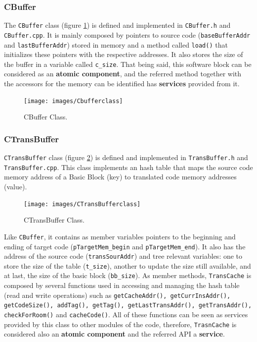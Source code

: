 \documentclass[12pt]{article}
\begin{document}
{\newpage
\subsubsection*{CBuffer}

The \texttt{CBuffer} class (figure \ref{fig:cbufferclass}) is defined and implemented in \texttt{CBuffer.h} and \texttt{CBuffer.cpp}. It is mainly composed by pointers to source code (\texttt{baseBufferAddr} and \texttt{lastBufferAddr}) stored in memory and a method called \texttt{load()} that initializes these pointers with the respective addresses. It also stores the size of the buffer in a variable called \texttt{c\_size}. That being said, this software block can be considered as an \textbf{atomic component}, and the referred method together with the accessors for the memory can be identified has \textbf{services} provided from it.

\begin{figure}[!htb]
\centerline{
\texttt{[image: images/Cbufferclass]}}
\caption{CBuffer Class.}
\label{fig:cbufferclass} 
\end{figure}

\subsubsection*{CTransBuffer}

\texttt{CTransBuffer} class (figure \ref{fig:tbufferclass}) is defined and implemented in \texttt{TransBuffer.h} and \texttt{TransBuffer.cpp}. This class implements an hash table that maps the source code memory address of a Basic Block (key) to translated code memory addresses (value). 

\begin{figure}[!htb]
\centerline{
\texttt{[image: images/CTransBufferclass]}}
\caption{CTransBuffer Class.}
\label{fig:tbufferclass} 
\end{figure}

Like \texttt{CBuffer}, it contains as member variables pointers to the beginning and ending of target code (\texttt{pTargetMem\_begin} and \texttt{pTargetMem\_end}). It also has the address of the source code (\texttt{transSourAddr}) and tree relevant variables: one to store the size of the table (\texttt{t\_size}), another to update the size still available, and at last, the size of the basic block (\texttt{bb\_size}). As member methods, \texttt{TransCache} is composed by several functions used in accessing and managing the hash table (read and write operations) such as \texttt{getCacheAddr(), getCurrInsAddr(), getCodeSize(), addTag(), getTag(), getLastTransAddr(), getTransAddr(), checkForRoom()} and \texttt{cacheCode()}. All of these functions can be seen as services provided by this class to other modules of the code, therefore, \texttt{TrasnCache} is considered also an \textbf{atomic component} and the referred API a \textbf{service}.




}
\end{document}

